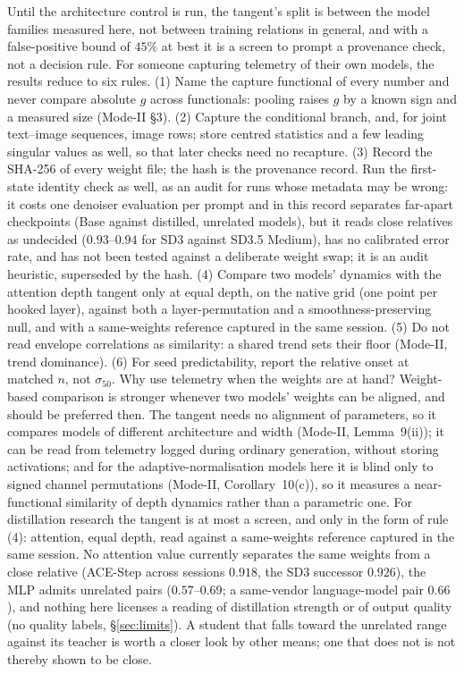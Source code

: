 \documentclass[11pt]{article}
\begin{document}
Until the architecture control is run, the tangent's split is between the model families measured here, not between training relations in general, and with a false-positive bound of $45\%$ at best it is a screen to prompt a provenance check, not a decision rule. For someone capturing telemetry of their own models, the results reduce to six rules. (1) Name the capture functional of every number and never compare absolute $g$ across functionals: pooling raises $g$ by a known sign and a measured size (Mode-II \S3). (2) Capture the conditional branch, and, for joint text--image sequences, image rows; store centred statistics and a few leading singular values as well, so that later checks need no recapture. (3) Record the SHA-256 of every weight file; the hash is the provenance record. Run the first-state identity check as well, as an audit for runs whose metadata may be wrong: it costs one denoiser evaluation per prompt and in this record separates far-apart checkpoints (Base against distilled, unrelated models), but it reads close relatives as undecided ($0.93$--$0.94$ for SD3 against SD3.5 Medium), has no calibrated error rate, and has not been tested against a deliberate weight swap; it is an audit heuristic, superseded by the hash. (4) Compare two models' dynamics with the attention depth tangent only at equal depth, on the native grid (one point per hooked layer), against both a layer-permutation and a smoothness-preserving null, and with a same-weights reference captured in the same session. (5) Do not read envelope correlations as similarity: a shared trend sets their floor (Mode-II, trend dominance). (6) For seed predictability, report the relative onset at matched $n$, not $\sigma_{50}$. Why use telemetry when the weights are at hand? Weight-based comparison is stronger whenever two models' weights can be aligned, and should be preferred then. The tangent needs no alignment of parameters, so it compares models of different architecture and width (Mode-II, Lemma~9(ii)); it can be read from telemetry logged during ordinary generation, without storing activations; and for the adaptive-normalisation models here it is blind only to signed channel permutations (Mode-II, Corollary~10(c)), so it measures a near-functional similarity of depth dynamics rather than a parametric one. For distillation research the tangent is at most a screen, and only in the form of rule (4): attention, equal depth, read against a same-weights reference captured in the same session. No attention value currently separates the same weights from a close relative (ACE-Step across sessions $0.918$, the SD3 successor $0.926$), the MLP admits unrelated pairs ($0.57$--$0.69$; a same-vendor language-model pair $0.66$), and nothing here licenses a reading of distillation strength or of output quality (no quality labels, \S\ref{sec:limits}). A student that falls toward the unrelated range against its teacher is worth a closer look by other means; one that does not is not thereby shown to be close.
\end{document}
